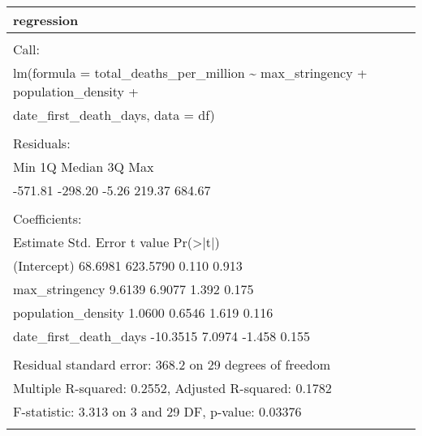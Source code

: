 \documentclass[
]{article}
\begin{document}
\begin{table}
\centering
\begin{tabular}[t]{l}
\hline
regression\\
\hline
\\
\hline
Call:\\
\hline
lm(formula = total\_deaths\_per\_million \textasciitilde{} max\_stringency + population\_density +\\
\hline
date\_first\_death\_days, data = df)\\
\hline
\\
\hline
Residuals:\\
\hline
Min      1Q  Median      3Q     Max\\
\hline
-571.81 -298.20   -5.26  219.37  684.67\\
\hline
\\
\hline
Coefficients:\\
\hline
Estimate Std. Error t value Pr(>|t|)\\
\hline
(Intercept)            68.6981   623.5790   0.110    0.913\\
\hline
max\_stringency          9.6139     6.9077   1.392    0.175\\
\hline
population\_density      1.0600     0.6546   1.619    0.116\\
\hline
date\_first\_death\_days -10.3515     7.0974  -1.458    0.155\\
\hline
\\
\hline
Residual standard error: 368.2 on 29 degrees of freedom\\
\hline
Multiple R-squared:  0.2552,    Adjusted R-squared:  0.1782\\
\hline
F-statistic: 3.313 on 3 and 29 DF,  p-value: 0.03376\\
\hline
\\
\hline
\end{tabular}
\end{table}
\end{document}

